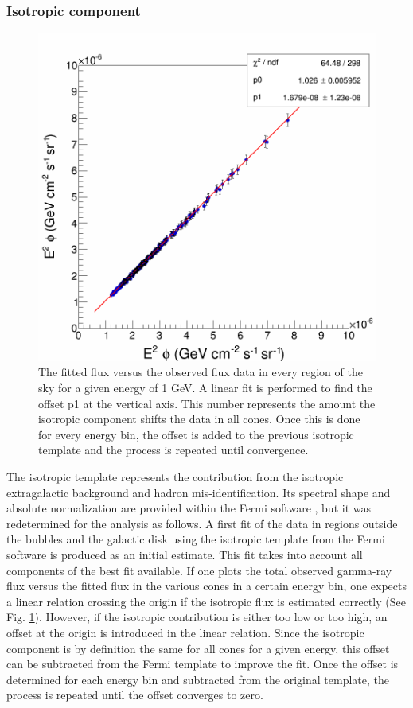 \subsubsection{Isotropic component}

\begin{figure}
 \centering
 \includegraphics[width=.5\linewidth]{pic/method/iso_calibration.png}
 \caption{The fitted flux versus the observed flux data in every region of the sky for a given energy of 1 GeV. A linear fit is performed to find the offset p1 at the vertical axis. This number represents the amount the isotropic component shifts the data in all cones. Once this is done for every energy bin, the offset is added to the previous isotropic template and the process is repeated until convergence. }
 \label{fig:iso_calibration}
\end{figure}


The isotropic template represents the contribution from the isotropic extragalactic background and hadron mis-identification. Its spectral shape and absolute normalization are provided within the Fermi software , but it was redetermined for the analysis as follows.
A first fit of the data in regions outside the bubbles and the galactic disk using the isotropic template from the Fermi software is produced as an initial estimate. This fit takes into account all components of the best fit available.
If one plots the total observed gamma-ray flux versus the fitted flux in the various cones in a certain energy bin, one expects a linear relation crossing the origin if the isotropic flux is estimated correctly (See Fig. \ref{fig:iso_calibration}). However, if the isotropic contribution is either too low or too high, an offset at the origin is introduced in the linear relation. Since the isotropic component is by definition the same for all cones for a given energy, this offset can be subtracted from the Fermi template to improve the fit. 
Once the offset is determined for each energy bin and subtracted from the original template, the process is repeated until the offset converges to zero.

